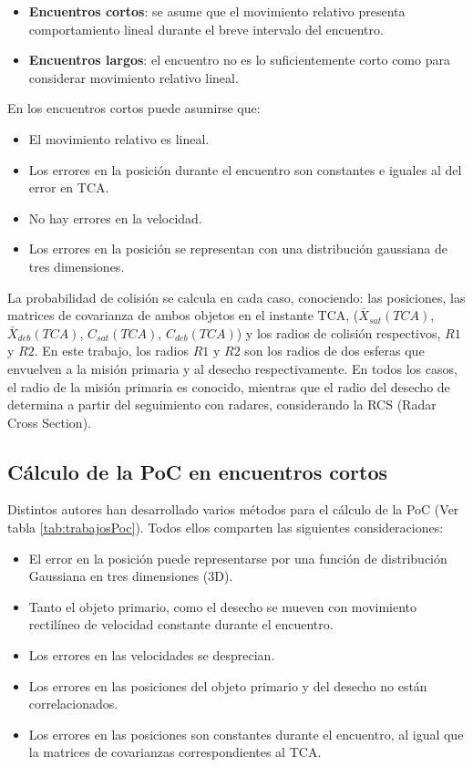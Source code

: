 \begin{itemize}
 \item {\bf{Encuentros cortos}}: se asume que el movimiento relativo presenta comportamiento lineal durante el breve intervalo del encuentro.
 \item {\bf{Encuentros largos}}: el encuentro no es lo suficientemente corto como para considerar movimiento relativo lineal.
\end{itemize}


En los encuentros cortos puede asumirse que:\\

\begin{itemize}
\itemsep0em
 \item El movimiento relativo es lineal.
 \item Los errores en la posici\'on durante el encuentro son constantes e iguales al del error en TCA.
 \item No hay errores en la velocidad.
 \item Los errores en la posici\'on se representan con una distribuci\'on gaussiana de tres dimensiones.
\end{itemize}

La probabilidad de colisi\'on se calcula en cada caso, conociendo: las posiciones, las matrices de covarianza de ambos objetos en el instante TCA, ($\bar{X}_{sat}(TCA)$, $\bar{X}_{deb}(TCA)$, $C_{sat}(TCA)$, $C_{deb}(TCA)$) y los radios de colisi\'on respectivos, $R1$ y $R2$. En este trabajo, los radios $R1$ y $R2$  son los radios de dos esferas que envuelven a la misi\'on primaria y al desecho respectivamente. En todos los casos, el radio de la misi\'on primaria es conocido, mientras que el radio del desecho de determina a partir del seguimiento con radares, considerando la RCS (Radar Cross Section). 

\subsection*{C\'alculo de la PoC en encuentros cortos}

Distintos autores han desarrollado varios m\'etodos para el c\'alculo de la PoC (Ver tabla \ref{tab:trabajosPoc}). Todos ellos comparten las siguientes consideraciones:\\
\begin{itemize}
\itemsep0em
\item El error en la posici\'on puede representarse por una funci\'on de distribuci\'on Gaussiana en tres dimensiones (3D).
\item Tanto el objeto primario, como el desecho se mueven con movimiento rectil\'ineo de velocidad constante durante el encuentro.
\item Los errores en las velocidades se desprecian.
\item Los errores en las posiciones del objeto primario y del desecho no est\'an correlacionados.
\item Los errores en las posiciones son constantes durante el encuentro, al igual que la matrices de covarianzas correspondientes al TCA.
\end{itemize}

